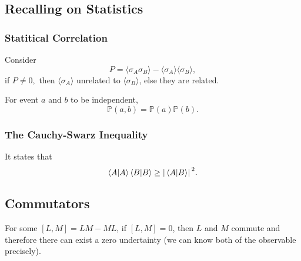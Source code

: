 \documentclass[a4paper]{article}
\begin{document}
\subsection{Recalling on Statistics}
\subsubsection{Statitical Correlation}
Consider 
\[
    P = \langle \sigma_A \sigma_B \rangle - \langle \sigma_A \rangle \langle \sigma_B \rangle,
\]
if $P \neq 0,$ then $\langle \sigma_A \rangle$ unrelated to $\langle \sigma_B \rangle$, else they are related.\\

\par For event $a$ and $b$ to be independent,
\[
    \mathbb{P}(a,b) = \mathbb{P}(a) \mathbb{P}(b).
\]  
\subsubsection{The Cauchy-Swarz Inequality}
It states that 
\[
    \braket{A}{A}\braket{B}{B} \geq \abs*{\braket*{A}{B}}^2.
\]  
\subsection{Commutators}
For some $[L,M]=LM-ML$, if $[L, M] = 0$, then $L$ and $M$ commute and therefore there can exist a zero undertainty (we can know both of the observable precisely).

















\end{document}
